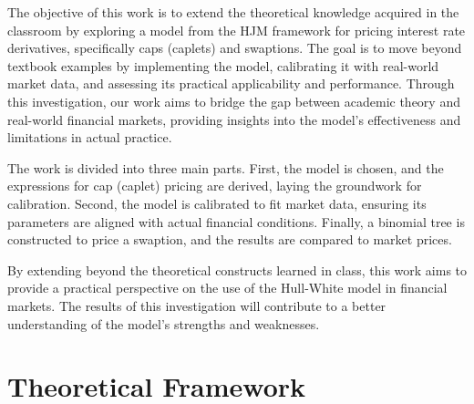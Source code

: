 \documentclass[titlepage, 12pt]{article}
\begin{document}
	The objective of this work is to extend the theoretical knowledge
	acquired in the classroom by exploring a model from the HJM framework
	for pricing interest rate derivatives, specifically caps (caplets) and
	swaptions. The goal is to move beyond textbook examples by implementing
	the model, calibrating it with real-world market data, and assessing its
	practical applicability and performance. Through this investigation, our
	work aims to bridge the gap between academic theory and real-world
	financial markets, providing insights into the model's effectiveness and
	limitations in actual practice.
	
	The work is divided into three main parts. First, the model is chosen,
	and the expressions for cap (caplet) pricing are derived, laying the
	groundwork for calibration. Second, the model is calibrated to fit
	market data, ensuring its parameters are aligned with actual financial
	conditions. Finally, a binomial tree is constructed to price a swaption, and the results are compared to market prices.
	
	By extending beyond the theoretical constructs learned in class,
	this work aims to provide a practical perspective on the use of the
	Hull-White model in financial markets. The results of this investigation
	will contribute to a better understanding of the model's strengths and
	weaknesses.
	
	\section{Theoretical Framework}\label{theoretical-framework}
\end{document}
